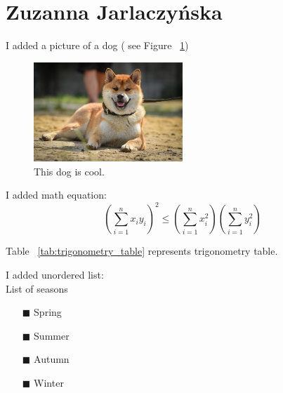 \section{Zuzanna Jarlaczyńska}
\label{zjarl}
I added a picture of a dog ( see Figure ~\ref{fig:dog})

\begin{figure}[htbp] 
    \centering
    \includegraphics[width=0.5\textwidth, scale=5]{pictures/dog.jpeg}
\caption{This dog is cool.}
    \label{fig:dog}
\end{figure}

I added math equation: \[ (\sum_{i=1}^{n}x_{i}y_{i})^2 \leq (\sum_{i=1}^{n}x_{i}^2)(\sum_{i=1}^{n}y_{i}^2) \] 

\newpage

Table ~\ref{tab:trigonometry_table} represents trigonometry table. 



I added unordered list: \\
List of seasons
\begin{itemize}
    \item[$\blacksquare$] Spring
    \item[$\blacksquare$] Summer
    \item[$\blacksquare$] Autumn
    \item[$\blacksquare$] Winter 
\end{itemize}

